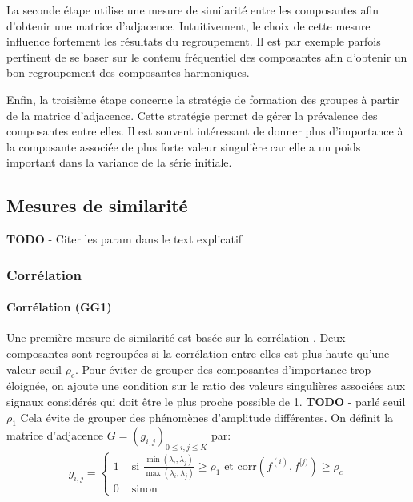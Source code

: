 \documentclass{gretsi}
\begin{document}
La seconde étape utilise une mesure de similarité entre les composantes afin d'obtenir une matrice d'adjacence. Intuitivement, le choix de cette mesure influence fortement les résultats du regroupement. Il est par exemple parfois pertinent de se  baser sur le contenu fréquentiel des composantes afin d'obtenir un bon regroupement des composantes harmoniques.

Enfin, la troisième étape concerne la stratégie de formation des groupes à partir de la matrice d'adjacence. Cette stratégie permet de gérer la prévalence des composantes entre elles. Il est souvent intéressant de donner plus d'importance à la composante associée de plus forte valeur singulière car elle a un poids important dans la variance de la série initiale.


\subsection{Mesures de similarité}
\label{sub:sim}
{\color{red} \textbf{TODO} - Citer les param dans le text explicatif} 

\subsubsection{Corrélation}\label{ssub:cor}
\paragraph{Corrélation (GG1)}\label{par:GG1}
    Une première mesure de similarité est basée sur la corrélation \cite{abalov_14_auto}. Deux composantes sont regroupées si la corrélation entre elles est plus haute qu'une valeur seuil $\rho_c$. Pour éviter de grouper des composantes d'importance trop éloignée, on ajoute une condition sur le ratio des valeurs singulières associées aux signaux considérés qui doit être  le plus proche possible de 1.
{\color{red} \textbf{TODO} - parlé seuil $\rho_1$}  Cela évite de grouper des phénomènes d'amplitude différentes. On définit la matrice d'adjacence $G = (g_{i, j})_{0 \le i,j\le K}$ par:
    $$
    g_{i, j} = \begin{cases}
	    1 &\text{ si } \displaystyle\frac{\min(\lambda_i, \lambda_j)}{\max(\lambda_i, \lambda_j)} \ge \rho_1 \text{ et } \text{corr}(f^{(i)}, f^{[j)}) \ge \rho_c\\
	    0& \text{ sinon}
    \end{cases}
    $$
\end{document}
